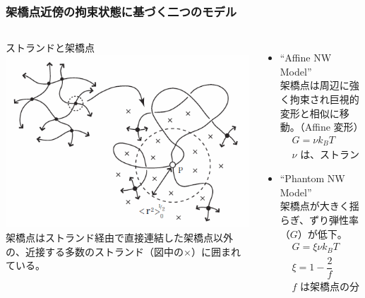 \documentclass[12pt, dvipdfmx]{beamer}
\begin{document}
\begin{frame}
	\frametitle{架橋点近傍の拘束状態に基づく二つのモデル}
		\begin{columns}[totalwidth=1\textwidth]
				\begin{block}{ストランドと架橋点}
					\includegraphics[width=\textwidth]{JP_vicinity.png}
					架橋点はストランド経由で直接連結した架橋点以外の、近接する多数のストランド（図中の×）に囲まれている。
				\end{block}
			\begin{itemize}
				\item ``Affine NW Model''\\
					架橋点は周辺に強く拘束され巨視的変形と相似に移動。（Affine 変形）
					\footnotesize
					\begin{align*}
						&G=\nu k_B T \\
						&\text{$\nu$ は、ストランドの数密度}
					\end{align*}
					\normalsize
				\item ``Phantom NW Model''\\
					架橋点が大きく揺らぎ、ずり弾性率（$G$）が低下。
					\footnotesize
					\begin{align*}
						&G=\xi \nu k_B T \\
						&\xi= 1 -\dfrac{2}{f}\\
						&\text{$f$ は架橋点の分岐数}
					\end{align*}
			\end{itemize}
		\end{columns}
\end{frame}
\end{document}
